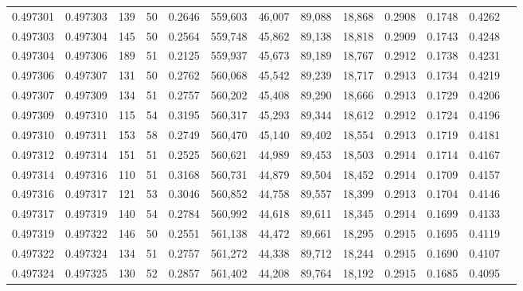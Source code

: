 \begin{tabular}{rrrrrrrrrrrrr}
0.497301 & 0.497303 &   139 &  50 &                                     0.2646 & 559,603 &  46,007 &  89,088 &  18,868 & 0.2908 & 0.1748 & 0.4262 \\
0.497303 & 0.497304 &   145 &  50 &                                     0.2564 & 559,748 &  45,862 &  89,138 &  18,818 & 0.2909 & 0.1743 & 0.4248 \\
0.497304 & 0.497306 &   189 &  51 &                                     0.2125 & 559,937 &  45,673 &  89,189 &  18,767 & 0.2912 & 0.1738 & 0.4231 \\
0.497306 & 0.497307 &   131 &  50 &                                     0.2762 & 560,068 &  45,542 &  89,239 &  18,717 & 0.2913 & 0.1734 & 0.4219 \\
0.497307 & 0.497309 &   134 &  51 &                                     0.2757 & 560,202 &  45,408 &  89,290 &  18,666 & 0.2913 & 0.1729 & 0.4206 \\
0.497309 & 0.497310 &   115 &  54 &                                     0.3195 & 560,317 &  45,293 &  89,344 &  18,612 & 0.2912 & 0.1724 & 0.4196 \\
0.497310 & 0.497311 &   153 &  58 &                                     0.2749 & 560,470 &  45,140 &  89,402 &  18,554 & 0.2913 & 0.1719 & 0.4181 \\
0.497312 & 0.497314 &   151 &  51 &                                     0.2525 & 560,621 &  44,989 &  89,453 &  18,503 & 0.2914 & 0.1714 & 0.4167 \\
0.497314 & 0.497316 &   110 &  51 &                                     0.3168 & 560,731 &  44,879 &  89,504 &  18,452 & 0.2914 & 0.1709 & 0.4157 \\
0.497316 & 0.497317 &   121 &  53 &                                     0.3046 & 560,852 &  44,758 &  89,557 &  18,399 & 0.2913 & 0.1704 & 0.4146 \\
0.497317 & 0.497319 &   140 &  54 &                                     0.2784 & 560,992 &  44,618 &  89,611 &  18,345 & 0.2914 & 0.1699 & 0.4133 \\
0.497319 & 0.497322 &   146 &  50 &                                     0.2551 & 561,138 &  44,472 &  89,661 &  18,295 & 0.2915 & 0.1695 & 0.4119 \\
0.497322 & 0.497324 &   134 &  51 &                                     0.2757 & 561,272 &  44,338 &  89,712 &  18,244 & 0.2915 & 0.1690 & 0.4107 \\
0.497324 & 0.497325 &   130 &  52 &                                     0.2857 & 561,402 &  44,208 &  89,764 &  18,192 & 0.2915 & 0.1685 & 0.4095 \\

\end{tabular}

